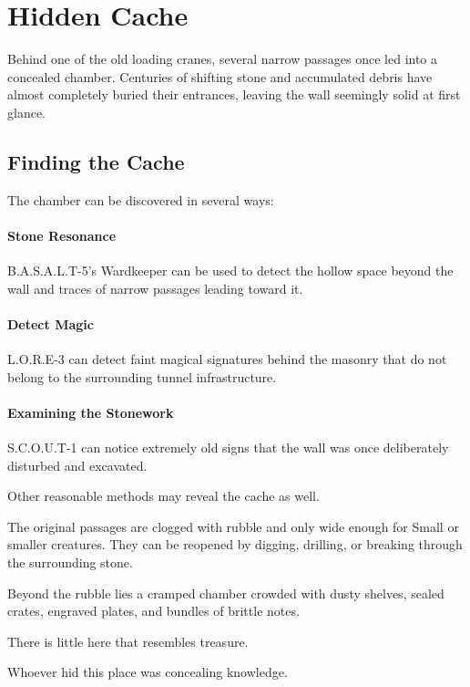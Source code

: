 \section*{ Hidden Cache}
{\entryfont Behind one of the old loading cranes, several narrow passages once led into a concealed chamber. Centuries of shifting stone and accumulated debris have almost completely buried their entrances, leaving the wall seemingly solid at first glance.}
\subsection*{Finding the Cache}
{\entryfont The chamber can be discovered in several ways:
\paragraph*{Stone Resonance} B.A.S.A.L.T-5's Wardkeeper can be used to detect the hollow space beyond the wall and traces of narrow passages leading toward it.
\paragraph*{Detect Magic} L.O.R.E-3 can detect faint magical signatures behind the masonry that do not belong to the surrounding tunnel infrastructure.
\paragraph*{Examining the Stonework} S.C.O.U.T-1 can notice extremely old signs that the wall was once deliberately disturbed and excavated.

\noindent Other reasonable methods may reveal the cache as well.

The original passages are clogged with rubble and only wide enough for Small or smaller creatures. They can be reopened by digging, drilling, or breaking through the surrounding stone.}
\begin{DndReadAloud}
	Beyond the rubble lies a cramped chamber crowded with dusty shelves, sealed crates, engraved plates, and bundles of brittle notes.

	There is little here that resembles treasure.

	Whoever hid this place was concealing knowledge.
\end{DndReadAloud}
